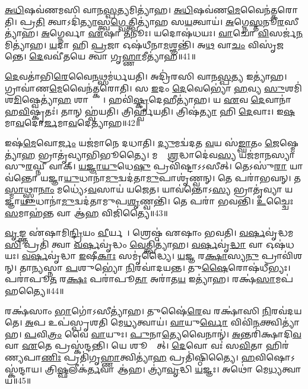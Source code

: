 \ul{𑌅}\ul{𑌧𑌿}𑌷𑌵॑𑌣𑌮𑌸𑌿 𑌵𑌾𑌨\ul{𑌸𑍍𑌪}𑌤𑍍𑌯𑌮𑌿𑌤𑍍𑌯𑌾॑𑌹।
\ul{𑌅}\ul{𑌧𑌿}𑌷𑌵॑𑌣\-\ul{𑌮𑍇}𑌵𑍈𑌨॑𑌤𑍍𑌕𑌰𑍋𑌤𑌿।
𑌪𑍍𑌰\ul{𑌤𑌿} 𑌤𑍍𑌵𑌾\-𑌽𑌦𑌿॑\ul{𑌤𑍍𑌯𑌾}𑌸𑍍𑌤𑍍𑌵\ul{𑌗𑍍𑌵𑍇}𑌤𑍍𑌤𑍍𑌵𑌿𑌤𑍍𑌯𑌾॑𑌹 𑌸\ul{𑌯}𑌤𑍍𑌵𑌾𑌯॑।
\ul{𑌅}𑌗𑍍𑌨𑍇\ul{𑌸𑍍𑌤}𑌨𑍂\ul{𑌰}𑌸𑍀\-𑌤𑍍𑌯𑌾॑𑌹।
\ul{𑌅}𑌗𑍍𑌨𑍇𑌰𑍍𑌵𑌾 \ul{𑌏}𑌷𑌾 \ul{𑌤}𑌨𑍂𑌃।
𑌯𑌦𑍋𑌷॑𑌧𑌯𑌃।
\ul{𑌵𑌾}𑌚𑍋 \ul{𑌵𑌿}𑌸𑌰𑍍𑌜॑\ul{𑌨}𑌮𑌿𑌤𑍍𑌯𑌾॑𑌹।
\ul{𑌯}𑌦𑌾 𑌹𑌿 \ul{𑌪𑍍𑌰}𑌜𑌾 𑌓𑌷॑𑌧𑍀𑌨𑌾\ul{𑌮}𑌶𑍍𑌞𑌨𑍍𑌤𑌿॑।
𑌅\ul{𑌥} 𑌵𑌾\ul{𑌚𑌂} 𑌵𑌿𑌸𑍃॑𑌜𑌨𑍍𑌤𑍇।
\ul{𑌦𑍇}𑌵𑌵𑍀॑𑌤𑌯𑍇 𑌤𑍍𑌵𑌾 𑌗𑍃\ul{𑌹𑍍𑌣𑌾}𑌮𑍀𑌤𑍍𑌯𑌾॑𑌹॥41॥

\ul{𑌦𑍇}𑌵𑌤𑌾॑𑌭𑌿\ul{𑌰𑍇}𑌵𑍈\ul{𑌨}𑌥𑍍𑌸𑌮॑𑌰𑍍𑌧𑌯𑌤𑌿।
𑌅𑌦𑍍𑌰𑌿॑𑌰𑌸𑌿 𑌵𑌾𑌨\ul{𑌸𑍍𑌪}𑌤𑍍𑌯 𑌇𑌤𑍍𑌯𑌾॑𑌹।
𑌗𑍍𑌰𑌾𑌵𑌾॑𑌣\ul{𑌮𑍇}𑌵𑍈𑌨॑𑌤𑍍𑌕𑌰𑍋𑌤𑌿।
𑌸 \ul{𑌇}𑌦𑌂 \ul{𑌦𑍇}𑌵𑍇𑌭𑍍𑌯𑍋॑ \ul{𑌹}𑌵𑍍𑌯 \ul{𑌸𑍁}𑌶𑌮𑌿॑ 𑌶\ul{𑌮𑌿}𑌷𑍍𑌵𑍇𑌤𑍍𑌯𑌾॑\ul{𑌹} 𑌶𑌾𑌨𑍍𑌤𑍍𑌯𑍈᳚।
𑌹𑌵𑌿॑\ul{𑌷𑍍𑌕𑍃}𑌦𑍇𑌹𑍀𑌤𑍍𑌯𑌾॑𑌹।
𑌯 \ul{𑌏}𑌵 \ul{𑌦𑍇}𑌵𑌾𑌨𑌾॑ 𑌹\ul{𑌵𑌿}𑌷𑍍𑌕𑍃𑌤𑌃॑।
𑌤𑌾𑌨𑍍‌ 𑌹𑍍𑌵॑𑌯𑌤𑌿।
𑌤𑍍𑌰𑌿𑌰𑍍𑌹𑍍𑌵॑𑌯𑌤𑌿।
𑌤𑍍𑌰𑌿𑌷॑\ul{𑌤𑍍𑌯𑌾} 𑌹𑌿 \ul{𑌦𑍇}𑌵𑌾𑌃।
𑌇\ul{𑌷}𑌮𑌾\ul{𑌵}𑌦𑍋\ul{𑌰𑍍𑌜}𑌮𑌾\ul{𑌵}𑌦𑍇𑌤𑍍𑌯𑌾॑𑌹॥42॥

𑌇𑌷॑\ul{𑌮𑍇}𑌵𑍋\ul{𑌰𑍍𑌜𑌂} 𑌯𑌜॑𑌮𑌾𑌨𑍇 𑌦𑌧𑌾𑌤𑌿।
\ul{𑌦𑍍𑌯𑍁}𑌮𑌦𑍍𑌵॑𑌦𑌤 \ul{𑌵}𑌯 𑌸॑\ul{𑌙𑍍𑌘𑌾}𑌤𑌂 \ul{𑌜𑍇}𑌷𑍍𑌮𑍇𑌤𑍍𑌯𑌾॑\ul{𑌹} 𑌭𑍍𑌰𑌾𑌤𑍃॑𑌵𑍍𑌯𑌾𑌭𑌿𑌭𑍂𑌤𑍍𑌯𑍈।
𑌮𑌨𑍋𑌃᳚ \ul{𑌶𑍍𑌰}𑌦𑍍𑌧𑌾𑌦𑍇॑𑌵\ul{𑌸𑍍𑌯} 𑌯𑌜॑𑌮𑌾𑌨𑌸𑍍𑌯𑌾\-𑌸𑍁\ul{𑌰}𑌘𑍍𑌨𑍀 𑌵𑌾𑌕𑍍।
\ul{𑌯}\ul{𑌜𑍍𑌞𑌾}\ul{𑌯𑍁}𑌧𑍇\ul{𑌷𑍁} 𑌪𑍍𑌰𑌵𑌿॑𑌷𑍍𑌟𑌾\-𑌽𑌽𑌸𑍀𑌤𑍍।
𑌤𑍇𑌽𑌸𑍁॑\ul{𑌰𑌾} 𑌯𑌾𑌵॑𑌨𑍍𑌤𑍋 𑌯𑌜𑍍𑌞𑌾\ul{𑌯𑍁}𑌧𑌾𑌨𑌾॑\ul{𑌮𑍁}𑌦𑍍𑌵𑌦॑𑌤𑌾\ul{𑌮𑍁}𑌪𑌾𑌶𑍃॑𑌣𑍍𑌵𑌨𑍍।
𑌤𑍇 𑌪𑌰𑌾॑𑌭𑌵𑌨𑍍।
𑌤\ul{𑌸𑍍𑌮𑌾}𑌥𑍍𑌸𑍍𑌵𑌾\ul{𑌨𑌾𑌂} 𑌮𑌧𑍍𑌯𑍇॑\-𑌽\ul{𑌵}𑌸𑌾𑌯॑ 𑌯𑌜𑍇𑌤।
𑌯𑌾𑌵॑𑌨𑍍𑌤𑍋\-𑌽\ul{𑌸𑍍𑌯} 𑌭𑍍𑌰𑌾𑌤𑍃॑𑌵𑍍𑌯𑌾 𑌯𑌜𑍍𑌞𑌾\ul{𑌯𑍁}𑌧𑌾𑌨𑌾॑\-\ul{𑌮𑍁}𑌦𑍍𑌵𑌦॑𑌤𑌾𑌮𑍁𑌪\-\ul{𑌶𑍃}𑌣𑍍𑌵𑌨𑍍𑌤𑌿॑।
𑌤𑍇 𑌪𑌰𑌾॑ 𑌭𑌵𑌨𑍍𑌤𑌿।
\ul{𑌉}𑌚𑍍𑌚𑍈𑌃 \ul{𑌸}𑌮𑌾𑌹॑\ul{𑌨𑍍𑌤} 𑌵𑌾 𑌆॑\ul{𑌹} 𑌵𑌿𑌜𑌿॑𑌤𑍍𑌯𑍈॥43॥

\ul{𑌵𑍃}𑌙𑍍𑌕𑍍𑌤 𑌏॑𑌷𑌾𑌮𑌿\ul{𑌨𑍍𑌦𑍍𑌰𑌿}𑌯𑌂 \ul{𑌵𑍀}𑌰𑍍𑌯𑌮𑍍᳚।
𑌶𑍍𑌰𑍇𑌷𑍍𑌠॑ 𑌏𑌷𑌾𑌂 𑌭𑌵𑌤𑌿।
\ul{𑌵}\ul{𑌰𑍍}𑌷𑌵𑍃॑𑌦𑍍𑌧𑌮\ul{𑌸𑌿} 𑌪𑍍𑌰𑌤𑌿॑ 𑌤𑍍𑌵𑌾 \ul{𑌵}\ul{𑌰𑍍}𑌷𑌵𑍃॑𑌦𑍍𑌧𑌂 \ul{𑌵𑍇}𑌤𑍍𑌤𑍍𑌵𑌿𑌤𑍍𑌯𑌾॑𑌹।
\ul{𑌵}\ul{𑌰𑍍}𑌷𑌵𑍃॑\ul{𑌦𑍍𑌧𑌾} 𑌵𑌾 𑌓𑌷॑𑌧𑌯𑌃।
\ul{𑌵}\ul{𑌰𑍍}𑌷𑌵𑍃॑𑌦𑍍𑌧𑌾 \ul{𑌇}𑌷𑍀\ul{𑌕𑌾𑌃} 𑌸𑌮𑍃॑𑌦𑍍𑌧𑍍𑌯𑍈।
\ul{𑌯}𑌜𑍍𑌞 𑌰\ul{𑌕𑍍𑌷𑌾}\ul{}𑌸𑍍𑌯\ul{𑌨𑍁} 𑌪𑍍𑌰𑌾𑌵𑌿॑𑌶𑌨𑍍।
𑌤𑌾\ul{𑌨𑍍𑌯}𑌸𑍍𑌨𑌾 \ul{𑌪}𑌶𑍁𑌭𑍍𑌯𑍋॑ \ul{𑌨𑌿}𑌰𑌵𑌾॑𑌦𑌯𑌨𑍍𑌤।
𑌤𑍁\ul{𑌷𑍈}𑌰𑍋𑌷॑𑌧𑍀𑌭𑍍𑌯𑌃।
𑌪𑌰𑌾॑𑌪𑍂\ul{𑌤}\ul{} 𑌰\ul{𑌕𑍍𑌷𑌃} 𑌪𑌰𑌾॑𑌪𑍂\ul{𑌤𑌾} 𑌅𑌰𑌾॑𑌤\ul{𑌯} 𑌇𑌤𑍍𑌯𑌾॑𑌹।
𑌰𑌕𑍍𑌷॑\ul{𑌸𑌾}𑌮𑌪॑𑌹𑌤𑍍𑌯𑍈॥44॥

𑌰𑌕𑍍𑌷॑𑌸𑌾𑌂 \ul{𑌭𑌾}𑌗𑍋॑\-𑌽𑌸𑍀𑌤𑍍𑌯𑌾॑𑌹।
𑌤𑍁𑌷𑍈॑\ul{𑌰𑍇}𑌵 𑌰𑌕𑍍𑌷𑌾॑𑌸𑌿 \ul{𑌨𑌿}𑌰𑌵॑𑌦𑌯𑌤𑍇।
\ul{𑌅}𑌪 𑌉𑌪॑𑌸𑍍𑌪𑍃𑌶𑌤𑌿 𑌮𑍇\ul{𑌧𑍍𑌯}𑌤𑍍𑌵𑌾𑌯॑।
\ul{𑌵𑌾}𑌯𑍁\ul{𑌰𑍍𑌵𑍋} 𑌵𑌿𑌵𑌿॑\ul{𑌨}𑌕𑍍𑌤𑍍𑌵𑌿𑌤𑍍𑌯𑌾॑𑌹।
\ul{𑌪}𑌵𑌿\ul{𑌤𑍍𑌰𑌂} 𑌵𑍈 \ul{𑌵𑌾}𑌯𑍁𑌃।
\ul{𑌪𑍁}𑌨𑌾\ul{𑌤𑍍𑌯𑍇}𑌵𑍈𑌨𑌾𑌨𑍍॑।
\ul{𑌅}𑌨𑍍𑌤𑌰𑌿॑𑌕𑍍𑌷𑌾𑌦𑌿\ul{𑌵} 𑌵𑌾 \ul{𑌏}𑌤𑍇 𑌪𑍍𑌰𑌸𑍍𑌕॑𑌨𑍍𑌦𑌨𑍍𑌤𑌿।
𑌯𑍇 𑌶𑍂𑌰𑍍𑌪𑌾᳚𑌤𑍍।
\ul{𑌦𑍇}𑌵𑍋 𑌵𑌃॑ 𑌸\ul{𑌵𑌿}𑌤𑌾 𑌹𑌿𑌰॑𑌣𑍍𑌯𑌪𑌾\ul{𑌣𑌿𑌃} 𑌪𑍍𑌰𑌤𑌿॑\-𑌗𑍃\ul{𑌹𑍍𑌣𑌾}𑌤𑍍𑌵𑌿𑌤𑍍𑌯𑌾॑\ul{𑌹} 𑌪𑍍𑌰𑌤𑌿॑\-𑌷𑍍𑌠𑌿𑌤𑍍𑌯𑍈।
\ul{𑌹}𑌵𑌿𑌷𑍋\-𑌽𑌸𑍍𑌕॑𑌨𑍍𑌦𑌾𑌯।
𑌤𑍍𑌰𑌿\ul{𑌷𑍍𑌫}𑌲𑍀𑌕॑\ul{𑌰𑍍𑌤}𑌵𑌾 𑌆॑𑌹।
𑌤𑍍𑌰𑍍𑌯𑌾॑\ul{𑌵𑍃}𑌦𑍍𑌧𑌿 \ul{𑌯}𑌜𑍍𑌞𑌃।
𑌅𑌥𑍋॑ 𑌮𑍇\ul{𑌧𑍍𑌯}𑌤𑍍𑌵𑌾𑌯॑॥45॥\anuvakamend[𑌦𑍍𑌵𑌾\ul{𑌭𑍍𑌯𑌾}𑌮𑍁𑌤𑍍𑌪𑍁॑𑌨𑌾𑌤𑌿 \ul{𑌰}𑌶𑍍𑌮𑌯𑍋॑ 𑌨\ul{𑌯}𑌨𑍍𑌤𑍍𑌯𑌗𑍍𑌰𑍇॑ \ul{𑌯}𑌜𑍍𑌞𑌪॑𑌤𑌿𑌂 \ul{𑌯}𑌜𑍍𑌞𑍋\-𑌽𑌦𑌿॑\ul{𑌤𑌿}𑌰𑌸𑍍𑌕॑𑌨𑍍𑌦𑌾𑌯 𑌗𑍃\ul{𑌹𑍍𑌣𑌾}𑌮𑍀𑌤𑍍𑌯𑌾॑𑌹 \ul{𑌵}𑌦𑍇𑌤𑍍𑌯𑌾॑\ul{𑌹} 𑌵𑌿𑌜𑌿॑\ul{𑌤𑍍𑌯𑌾} 𑌅𑌪॑𑌹\ul{𑌤𑍍𑌯𑌾} 𑌅𑌸𑍍𑌕॑𑌨𑍍𑌦𑌾\ul{𑌯} 𑌤𑍍𑌰𑍀𑌣𑌿॑ 𑌚]

